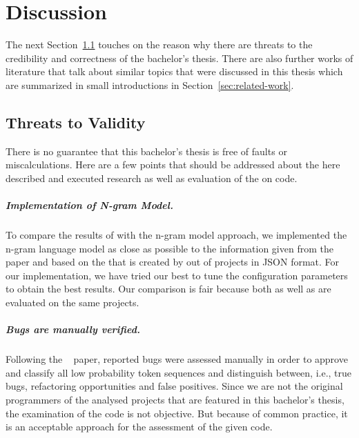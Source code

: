 \chapter{Discussion}\label{ch:discussion}
The next Section~\ref{sec:threats-to-validity} touches on the reason why there are threats to the credibility and correctness of the bachelor's thesis. There are also further works of literature that talk about similar topics that were discussed in this thesis which are summarized in small introductions in Section~\ref{sec:related-work}.

\section{Threats to Validity}\label{sec:threats-to-validity}
There is no guarantee that this bachelor's thesis is free of faults or miscalculations. Here are a few points that should be addressed about the here described and executed research as well as evaluation of the \ngram{} on \scratch{} code.

\paragraph{Implementation of N-gram Model.}
To compare the results of \litterbox{} with the n-gram model approach, we implemented the n-gram language model as close as possible to the information given from the \bugram{}~\cite{bugram} paper and based on the \AST{} that is created by \litterbox{} out of \scratch{} projects in JSON format. For our implementation, we have tried our best to tune the configuration parameters to obtain the best results. Our comparison is fair because both \litterbox{} as well as \ngram{} are evaluated on the same projects.

\paragraph{Bugs are manually verified.}
Following the \bugram{}~\cite{bugram} paper, reported bugs were assessed manually in order to approve and classify all low probability token sequences and distinguish between, i.e., true bugs, refactoring opportunities and false positives. Since we are not the original programmers of the analysed projects that are featured in this bachelor's thesis, the examination of the code is not objective. But because of common practice, it is an acceptable approach for the assessment of the given code.

